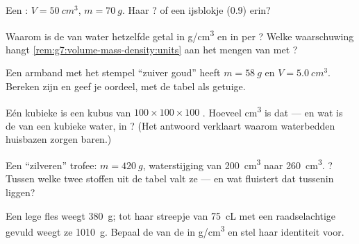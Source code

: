 \begin{exercise}[$\star$]\label{exo:g7:volume-mass-density:5}
Een : $V = \qty{50}{cm^3}$, $m = \qty{70}{g}$. Haar
?  of  een ijsblokje ($0.9$) erin?
\end{exercise}

\begin{exercise}[$\star$]\label{exo:g7:volume-mass-density:6}
Waarom is de  van water hetzelfde getal in \unit{g/cm^3} en
in  per ? Welke waarschuwing hangt
\cref{rem:g7:volume-mass-density:units} aan het mengen van
 met ?
\end{exercise}

\begin{exercise}[$\star$]\label{exo:g7:volume-mass-density:7}
Een armband met het stempel ``zuiver goud'' heeft $m = \qty{58}{g}$ en
$V = \qty{5.0}{cm^3}$. Bereken zijn  en geef je oordeel, met
de tabel als getuige.
\end{exercise}

\begin{exercise}[$\star\star$]\label{exo:g7:volume-mass-density:8}
Eén kubieke  is een kubus van $100 \times 100 \times 100$
. Hoeveel \unit{cm^3} is dat --- en wat is de  van
een kubieke  water, in ? (Het antwoord verklaart
waarom waterbedden huisbazen zorgen baren.)
\end{exercise}

\begin{exercise}[$\star\star$]\label{exo:g7:volume-mass-density:9}
Een ``zilveren'' trofee: $m = \qty{420}{g}$, waterstijging van
\qty{200}{cm^3} naar \qty{260}{cm^3}. ? Tussen welke twee
stoffen uit de tabel valt ze --- en wat fluistert dat tussenin liggen?
\end{exercise}

\begin{exercise}[$\star\star$]\label{exo:g7:volume-mass-density:10}
Een lege fles weegt \qty{380}{g}; tot haar streepje van \qty{75}{cL}
met een raadselachtige  gevuld weegt ze \qty{1010}{g}. Bepaal
de  van de  in \unit{g/cm^3} en stel haar
identiteit voor.
\end{exercise}

